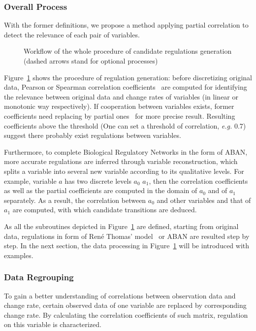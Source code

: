\subsubsection{Overall Process}

With the former definitions, we propose a method applying partial correlation to detect the relevance of each pair of variables.

\begin{figure}[ht]

\caption[Workflow of model inference \textit{via} partial correlation]{Workflow of the whole procedure of candidate regulations generation (dashed arrows stand for optional processes)}\label{plan}
\end{figure}

Figure~\ref{plan} shows the procedure of regulation generation: before discretizing original data, Pearson or Spearman correlation coefficients~\cite{samaga2009logic,hauke2011comparison} are computed for identifying the relevance between original data and change rates of variables (in linear or monotonic way respectively). If cooperation between variables exists, former coefficients need replacing by partial ones~\cite{de2004discovery} for more precise result.
Resulting coefficients above the threshold (One can set a threshold of correlation, \textit{e.g.} 0.7) suggest there probably exist regulations between variables.

Furthermore, to complete Biological Regulatory Networks in the form of ABAN, more accurate regulations are inferred through variable reconstruction, which splits a variable into several new variable according to its qualitative levels.
For example, variable $a$ has two discrete levels $a_0$ $a_1$, then the correlation coefficients as well as the partial coefficients are computed in the domain of $a_0$ and of $a_1$ separately.
As a result, the correlation between $a_0$ and other variables and that of $a_1$ are computed, with which candidate transitions are deduced.

As all the subroutines depicted in Figure~\ref{plan} are defined, starting from original data, regulations in form of Ren\'e Thomas' model~\cite{thomas1978} or ABAN are resulted step by step. In the next section, the data processing in Figure~\ref{plan} will be introduced with examples.

\subsubsection*{Data Regrouping}
To gain a better understanding of correlations between observation data and change rate, certain observed data of one variable are replaced by corresponding change rate. By calculating the correlation coefficients of such matrix, regulation on this variable is characterized.

